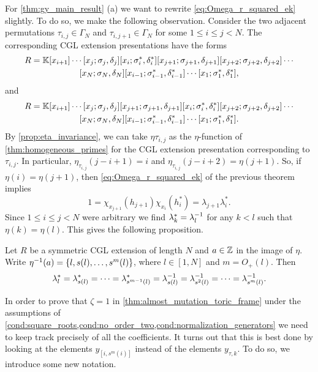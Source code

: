 For \cref{thm:gy_main_result} (a) we want to rewrite \cref{eq:Omega_r_squared_ek}
slightly. To do so, we make the following observation. Consider the two adjacent
permutations $\tau_{i,j} \in \Gamma_N$ and $\tau_{i, j+1} \in \Gamma_N$ for some $1
	\leq i \leq j < N$. The corresponding CGL extension presentations have the forms
\begin{multline}
	R = \mathbb{K}[x_{i+1}]\cdots[x_j;\sigma_j,\delta_j][x_i;\sigma^*_i,\delta^*_i][x_{j+1}; \sigma_{j+1}, \delta_{j+1}][x_{j+2}; \sigma_{j+2}, \delta_{j+2}]\cdots \\
	[x_N;\sigma_{N}, \delta_{N}][x_{i-1}; \sigma_{i-1}^*, \delta^*_{i-1}]\cdots[x_1; \sigma_1^*, \delta^*_1],
\end{multline}
and
\begin{multline}
	R = \mathbb{K}[x_{i+1}]\cdots[x_j;\sigma_j,\delta_j][x_{j+1}; \sigma_{j+1}, \delta_{j+1}][x_i;\sigma^*_i,\delta^*_i][x_{j+2}; \sigma_{j+2}, \delta_{j+2}]\cdots \\
	[x_N;\sigma_{N}, \delta_{N}][x_{i-1}; \sigma_{i-1}^*, \delta^*_{i-1}]\cdots[x_1; \sigma_1^*, \delta^*_1].
\end{multline}
%
By \cref{prop:eta_invariance}, we can take $\eta\tau_{i,j}$ as the $\eta$-function of
\cref{thm:homogeneous_primes} for the CGL extension presentation corresponding to
$\tau_{i,j}$. In particular, $\eta_{\tau_{i,j}}(j-i+1) = i$ and
$\eta_{\tau_{i,j}}(j-i+2) = \eta(j+1)$. So, if $\eta(i) = \eta(j+1)$, then
\cref{eq:Omega_r_squared_ek} of the previous theorem implies
\begin{equation*}
	1 = \chi_{x_{j+1}}(h_{j+1})\chi_{x_i}(h^*_i) = \lambda_{j+1}\lambda_i^*.
\end{equation*}
%
Since $1 \leq i \leq j < N$ were arbitrary we find $\lambda_{k}^* = \lambda_{l}^{-1}$
for any $k < l$ such that $\eta(k) = \eta(l)$. This gives the following proposition.
\begin{proposition}\label{prop:lambda*_of_successor}
	Let $R$ be a symmetric CGL extension of length $N$ and $a \in \mathbb{Z}$ in the image of $\eta$. Write $\eta^{-1}(a) = \{l, s(l), \dots, s^m(l)\}$, where $l\in [1, N]$ and $m = O_{+}(l)$. Then
	\begin{equation*}
		\lambda_l^* = \lambda_{s(l)}^* = \cdots = \lambda_{s^{m-1}(l)}^* = \lambda^{-1}_{s(l)}=\lambda^{-1}_{s^2(l)} = \cdots = \lambda^{-1}_{s^m(l)}.
	\end{equation*}
\end{proposition}

\medskip

In order to prove that $\zeta = 1$ in \cref{thm:almost_mutation_toric_frame} under the
assumptions of \cref{cond:square_roots,cond:no_order_two,cond:normalization_generators}
we need to keep track precisely of all the coefficients. It turns out that this is best
done by looking at the elements $y_{[i, s^m(i)]}$ instead of the elements $y_{\tau,
			k}$. To do so, we introduce some new notation.

